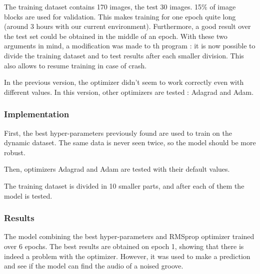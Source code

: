 \documentclass[12pt, twoside]{article}
\begin{document}
The training dataset contains 170 images, the test 30 images. 15\% of image blocks are used for validation. This makes training for one epoch quite long (around 3 hours with our current environment). Furthermore, a good result over the test set could be obtained in the middle of an epoch. With these two arguments in mind, a modification was made to th program : it is now possible to divide the training dataset and to test results after each smaller division. This also allows to resume training in case of crash.

In the previous version, the optimizer didn't seem to work correctly even with different values. In this version, other optimizers are tested : Adagrad and Adam.
\subsubsection{Implementation}
First, the best hyper-parameters previously found are used to train on the dynamic dataset. The same data is never seen twice, so the model should be more robust.

Then, optimizers Adagrad and Adam are tested with their default values.

The training dataset is divided in 10 smaller parts, and after each of them the model is tested.
\subsubsection{Results}
The model combining the best hyper-parameters and RMSprop optimizer trained over 6 epochs. The best results are obtained on epoch 1, showing that there is indeed a problem with the optimizer. However, it was used to make a prediction and see if the model can find the audio of a noised groove.
\end{document}
